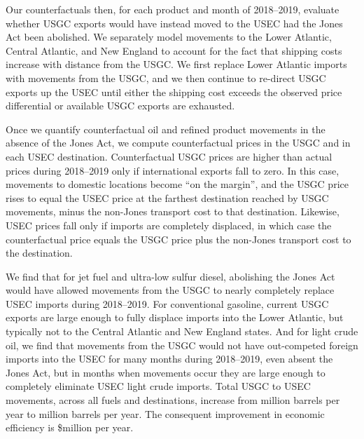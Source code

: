 \documentclass[12pt]{article}
\begin{document}
Our counterfactuals then, for each product and month of 2018--2019, evaluate whether USGC exports would have instead moved to the USEC had the Jones Act been abolished. We separately model movements to the Lower Atlantic, Central Atlantic, and New England to account for the fact that shipping costs increase with distance from the USGC. We first replace Lower Atlantic imports with movements from the USGC, and we then continue to re-direct USGC exports up the USEC until either the shipping cost exceeds the observed price differential or available USGC exports are exhausted.

Once we quantify counterfactual oil and refined product movements in the absence of the Jones Act, we compute counterfactual prices in the USGC and in each USEC destination. Counterfactual USGC prices are higher than actual prices during 2018--2019 only if international exports fall to zero. In this case, movements to domestic locations become ``on the margin'', and the USGC price rises to equal the USEC price at the farthest destination reached by USGC movements, minus the non-Jones transport cost to that destination. Likewise, USEC prices fall only if imports are completely displaced, in which case the counterfactual price equals the USGC price plus the non-Jones transport cost to the destination.

We find that for jet fuel and ultra-low sulfur diesel, abolishing the Jones Act would have allowed movements from the USGC to nearly completely replace USEC imports during 2018--2019. For conventional gasoline, current USGC exports are large enough to fully displace imports into the Lower Atlantic, but typically not to the Central Atlantic and New England states. And for light crude oil, we find that movements from the USGC would not have out-competed foreign imports into the USEC for many months during 2018--2019, even absent the Jones Act, but in months when movements occur they are large enough to completely eliminate USEC light crude imports. Total USGC to USEC movements, across all fuels and destinations, increase from million barrels per year to million barrels per year. The consequent improvement in economic efficiency is  \$million per year.
\end{document}
